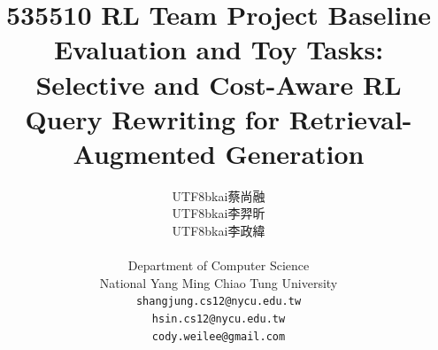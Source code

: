 \documentclass{article}
\title{535510 RL Team Project Baseline Evaluation and Toy Tasks:\\Selective and Cost-Aware RL Query Rewriting for Retrieval-Augmented Generation}
\author{%
  \begin{CJK*}{UTF8}{bkai}蔡尚融\end{CJK*}\quad\begin{CJK*}{UTF8}{bkai}李羿昕\end{CJK*}\quad\begin{CJK*}{UTF8}{bkai}李政緯\end{CJK*}\\
  Department of Computer Science\\
  National Yang Ming Chiao Tung University\\
  \texttt{shangjung.cs12@nycu.edu.tw} \\
  \texttt{hsin.cs12@nycu.edu.tw} \\
  \texttt{cody.weilee@gmail.com}
}
\begin{document}
\maketitle














\newpage
{
\small


}
\end{document}
